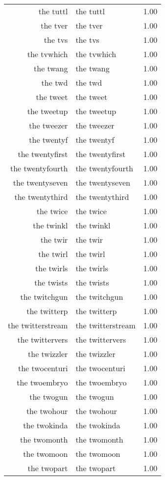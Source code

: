 \begin{table}[ht]
\begin{tabular}{rlr}
  the tuttl & the tuttl & 1.00 \\ 
  the tver & the tver & 1.00 \\ 
  the tvs & the tvs & 1.00 \\ 
  the tvwhich & the tvwhich & 1.00 \\ 
  the twang & the twang & 1.00 \\ 
  the twd & the twd & 1.00 \\ 
  the tweet & the tweet & 1.00 \\ 
  the tweetup & the tweetup & 1.00 \\ 
  the tweezer & the tweezer & 1.00 \\ 
  the twentyf & the twentyf & 1.00 \\ 
  the twentyfirst & the twentyfirst & 1.00 \\ 
  the twentyfourth & the twentyfourth & 1.00 \\ 
  the twentyseven & the twentyseven & 1.00 \\ 
  the twentythird & the twentythird & 1.00 \\ 
  the twice & the twice & 1.00 \\ 
  the twinkl & the twinkl & 1.00 \\ 
  the twir & the twir & 1.00 \\ 
  the twirl & the twirl & 1.00 \\ 
  the twirls & the twirls & 1.00 \\ 
  the twists & the twists & 1.00 \\ 
  the twitchgun & the twitchgun & 1.00 \\ 
  the twitterp & the twitterp & 1.00 \\ 
  the twitterstream & the twitterstream & 1.00 \\ 
  the twittervers & the twittervers & 1.00 \\ 
  the twizzler & the twizzler & 1.00 \\ 
  the twocenturi & the twocenturi & 1.00 \\ 
  the twoembryo & the twoembryo & 1.00 \\ 
  the twogun & the twogun & 1.00 \\ 
  the twohour & the twohour & 1.00 \\ 
  the twokinda & the twokinda & 1.00 \\ 
  the twomonth & the twomonth & 1.00 \\ 
  the twomoon & the twomoon & 1.00 \\ 
  the twopart & the twopart & 1.00 \\ 

\end{tabular}
\end{table}
